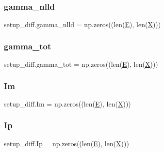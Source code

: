 \mbox{\label{namespacesetup__diff_aee21b548bf17144225ef9590e7f5ad2f}} 
\subsubsection{\texorpdfstring{gamma\+\_\+nlld}{gamma\_nlld}}
{\footnotesize\ttfamily setup\+\_\+diff.\+gamma\+\_\+nlld = np.\+zeros((len(\hyperlink{namespacesetup__diff_aa5cb1501a25fe4b39a92f30f468e71e8}{E}), len(\hyperlink{namespacesetup__diff_ad01f7c1ee607d8a67926e30be25385f1}{X})))}

\mbox{\label{namespacesetup__diff_a14ad390922cb53ce9a6e36452ef223c7}} 
\subsubsection{\texorpdfstring{gamma\+\_\+tot}{gamma\_tot}}
{\footnotesize\ttfamily setup\+\_\+diff.\+gamma\+\_\+tot = np.\+zeros((len(\hyperlink{namespacesetup__diff_aa5cb1501a25fe4b39a92f30f468e71e8}{E}), len(\hyperlink{namespacesetup__diff_ad01f7c1ee607d8a67926e30be25385f1}{X})))}

\mbox{\label{namespacesetup__diff_a38ff0a8851c3271bf72847bd1a55d4d8}} 
\subsubsection{\texorpdfstring{Im}{Im}}
{\footnotesize\ttfamily setup\+\_\+diff.\+Im = np.\+zeros((len(\hyperlink{namespacesetup__diff_aa5cb1501a25fe4b39a92f30f468e71e8}{E}), len(\hyperlink{namespacesetup__diff_ad01f7c1ee607d8a67926e30be25385f1}{X})))}

\mbox{\label{namespacesetup__diff_aaa41944c666c2f2e2f2fe0cad854082d}} 
\subsubsection{\texorpdfstring{Ip}{Ip}}
{\footnotesize\ttfamily setup\+\_\+diff.\+Ip = np.\+zeros((len(\hyperlink{namespacesetup__diff_aa5cb1501a25fe4b39a92f30f468e71e8}{E}), len(\hyperlink{namespacesetup__diff_ad01f7c1ee607d8a67926e30be25385f1}{X})))}

